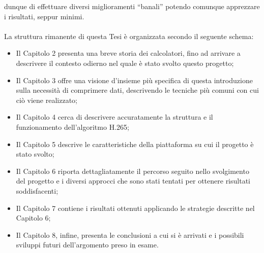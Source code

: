 dunque di effettuare diversi miglioramenti ``banali'' potendo comunque
apprezzare i risultati, seppur minimi.
\\ \\
La struttura rimanente di questa Tesi è organizzata secondo il seguente schema:
\begin{itemize}
\item Il Capitolo 2 presenta una breve storia dei calcolatori, fino ad arrivare
      a descrivere il contesto odierno nel quale è stato svolto questo progetto;
\item Il Capitolo 3 offre una visione d'insieme più specifica di questa 
      introduzione sulla necessità di comprimere dati, descrivendo le tecniche
      più comuni con cui ciò viene realizzato;
\item Il Capitolo 4 cerca di descrivere accuratamente la struttura e il
      funzionamento dell'algoritmo H.265;
\item Il Capitolo 5 descrive le caratteristiche della piattaforma su cui il
      progetto è stato svolto;
\item Il Capitolo 6 riporta dettagliatamente il percorso seguito nello 
      svolgimento del progetto e i diversi approcci che sono stati tentati per
      ottenere risultati soddisfacenti;
\item Il Capitolo 7 contiene i risultati ottenuti applicando le strategie
      descritte nel Capitolo 6;
\item Il Capitolo 8, infine, presenta le conclusioni a cui si è arrivati e i
      possibili sviluppi futuri dell'argomento preso in esame.
\end{itemize}